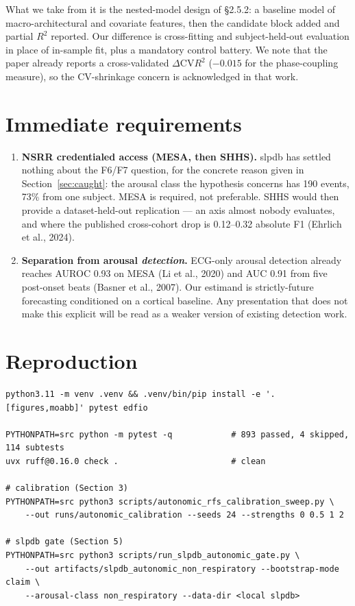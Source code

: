 \documentclass[11pt]{article}
\begin{document}
What we take from it is the nested-model design of \S2.5.2: a baseline model of
macro-architectural and covariate features, then the candidate block added and
partial $R^2$ reported. Our difference is cross-fitting and subject-held-out
evaluation in place of in-sample fit, plus a mandatory control battery. We note
that the paper already reports a cross-validated $\Delta \mathrm{CV}R^2$
($-0.015$ for the phase-coupling measure), so the CV-shrinkage concern is
acknowledged in that work.

\section{Immediate requirements}

\begin{enumerate}
  \item \textbf{NSRR credentialed access (MESA, then SHHS).} slpdb has settled
  nothing about the F6/F7 question, for the concrete reason given in
  Section~\ref{sec:caught}: the arousal class the hypothesis concerns has 190
  events, 73\% from one subject. MESA is required, not preferable. SHHS would then
  provide a dataset-held-out replication --- an axis almost nobody evaluates, and
  where the published cross-cohort drop is 0.12--0.32 absolute F1
  (Ehrlich et al., 2024).
  \item \textbf{Separation from arousal \emph{detection}.} ECG-only arousal
  detection already reaches AUROC 0.93 on MESA (Li et al., 2020) and AUC 0.91 from
  five post-onset beats (Basner et al., 2007). Our estimand is strictly-future
  forecasting conditioned on a cortical baseline. Any presentation that does not
  make this explicit will be read as a weaker version of existing detection work.
\end{enumerate}

\section{Reproduction}

\small
\begin{verbatim}
python3.11 -m venv .venv && .venv/bin/pip install -e '.[figures,moabb]' pytest edfio

PYTHONPATH=src python -m pytest -q            # 893 passed, 4 skipped, 114 subtests
uvx ruff@0.16.0 check .                       # clean

# calibration (Section 3)
PYTHONPATH=src python3 scripts/autonomic_rfs_calibration_sweep.py \
    --out runs/autonomic_calibration --seeds 24 --strengths 0 0.5 1 2

# slpdb gate (Section 5)
PYTHONPATH=src python3 scripts/run_slpdb_autonomic_gate.py \
    --out artifacts/slpdb_autonomic_non_respiratory --bootstrap-mode claim \
    --arousal-class non_respiratory --data-dir <local slpdb>
\end{verbatim}
\normalsize
\end{document}
